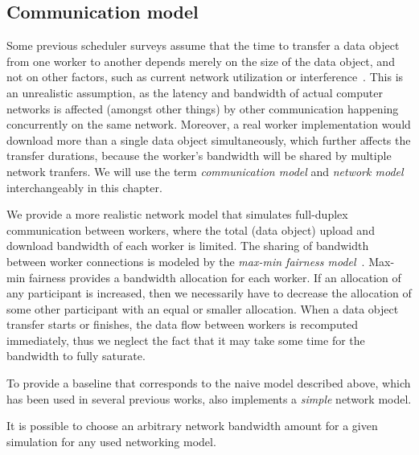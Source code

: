 \subsection{Communication model}
Some previous scheduler surveys assume that the time to transfer a data object from one worker to
another depends merely on the size of the data object, and not on other factors, such as current
network utilization or interference~\cite{tang2010list,yao2013task,wang2018list,kwok1996dynamic}. This is an unrealistic assumption, as
the latency and bandwidth of actual computer networks is affected (amongst other things) by other
communication happening concurrently on the same network. Moreover, a real worker implementation
would download more than a single data object simultaneously, which further affects the transfer
durations, because the worker's bandwidth will be shared by multiple network tranfers. We will use
the term \emph{communication model} and \emph{network model} interchangeably in this chapter.

We provide a more realistic network model that simulates full-duplex communication between workers,
where the total (data object) upload and download bandwidth of each worker is limited. The sharing
of bandwidth between worker connections is modeled by the
\emph{max-min fairness model}~\cite{bertsekas_1992}. Max-min fairness provides a bandwidth allocation
for each worker. If an allocation of any participant is increased, then we necessarily have to
decrease the allocation of some other participant with an equal or smaller allocation. When a data
object transfer starts or finishes, the data flow between workers is recomputed immediately, thus
we neglect the fact that it may take some time for the bandwidth to fully saturate.


To provide a baseline that corresponds to the naive model described above, which has been used in
several previous works, \estee{} also implements a \emph{simple} network
model.

It is possible to choose an arbitrary network bandwidth amount for a given simulation for any used
networking model.

